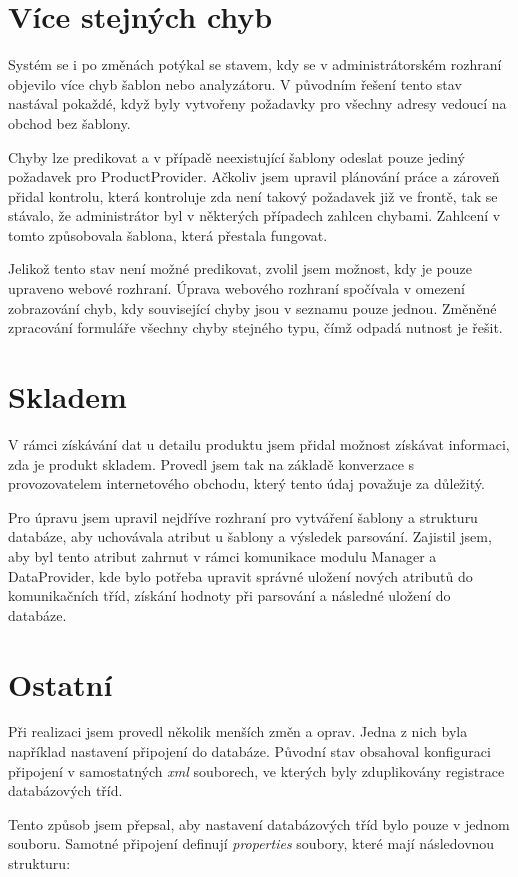 \documentclass[thesis=B,czech]{FITthesis}[2012/06/26]
\begin{document}
\section{Více stejných chyb}
Systém se i po změnách potýkal se stavem, kdy se v administrátorském rozhraní objevilo více chyb šablon nebo analyzátoru.
V původním řešení tento stav nastával pokaždé, když byly vytvořeny požadavky pro všechny adresy vedoucí na obchod bez šablony.
\par
Chyby lze predikovat a v případě neexistující šablony odeslat pouze jediný požadavek pro ProductProvider. Ačkoliv jsem 
upravil plánování práce a zároveň přidal kontrolu, která kontroluje zda není takový požadavek již ve frontě, tak se stávalo, že administrátor 
byl v některých případech zahlcen chybami. Zahlcení v tomto způsobovala šablona, která přestala fungovat.
\par
Jelikož tento stav není možné predikovat, zvolil jsem možnost, kdy je pouze upraveno webové rozhraní.
Úprava webového rozhraní spočívala v omezení zobrazování chyb, kdy související chyby jsou v seznamu pouze jednou. 
Změněné zpracování formuláře  všechny chyby stejného typu, čímž odpadá nutnost je řešit.

\section{Skladem}
V rámci získávání dat u detailu produktu jsem přidal možnost získávat informaci, zda je produkt skladem. Provedl jsem tak na základě
konverzace s provozovatelem internetového obchodu, který tento údaj považuje za důležitý.
\par
Pro úpravu jsem upravil nejdříve rozhraní pro vytváření šablony a strukturu databáze, aby uchovávala atribut u šablony a výsledek parsování.
Zajistil jsem, aby byl tento atribut zahrnut v rámci komunikace modulu Manager a DataProvider, kde bylo potřeba upravit
správné uložení nových atributů do komunikačních tříd, získání hodnoty při parsování a následné uložení do databáze.

\section{Ostatní}
Při realizaci jsem provedl několik menších změn a oprav. Jedna z nich byla například nastavení 
připojení do databáze. Původní stav obsahoval konfiguraci připojení v samostatných \textit{xml} souborech, ve kterých byly zduplikovány
registrace databázových tříd.
\par
Tento způsob jsem přepsal, aby nastavení databázových tříd bylo pouze v jednom souboru. Samotné připojení definují
\textit{properties} soubory, které mají následovnou strukturu:
\end{document}
